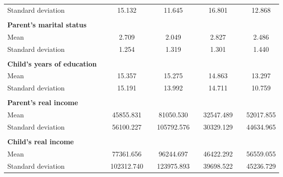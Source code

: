 \begin{tabular}{lrccccccc}
Standard deviation &           & 15.132    &           & 11.645    &           & 16.801    &           & 12.868 \\
          &           &           &           &           &           &           &           &  \\
\textbf{Parent's marital status} &           &           &           &           &           &           &           &  \\
Mean      &           & 2.709     &           & 2.049     &           & 2.827     &           & 2.486 \\
Standard deviation &           & 1.254     &           & 1.319     &           & 1.301     &           & 1.440 \\
          &           &           &           &           &           &           &           &  \\
\textbf{Child's years of education} &           &           &           &           &           &           &           &  \\
Mean      &           & 15.357    &           & 15.275    &           & 14.863    &           & 13.297 \\
Standard deviation &           & 15.191    &           & 13.992    &           & 14.711    &           & 10.759 \\
          &           &           &           &           &           &           &           &  \\
\textbf{Parent's real income} &           &           &           &           &           &           &           &  \\
Mean      &           & 45855.831 &           & 81050.530 &           & 32547.489 &           & 52017.855 \\
Standard deviation &           & 56100.227 &           & 105792.576 &           & 30329.129 &           & 44634.965 \\
          &           &           &           &           &           &           &           &  \\
\textbf{Child's real income} &           &           &           &           &           &           &           &  \\
Mean      &           & 77361.656 &           & 96244.697 &           & 46422.292 &           & 56559.055 \\
Standard deviation &           & 102312.740 &           & 123975.893 &           & 39698.522 &           & 45236.729 \\
\bottomrule
\end{tabular}%
